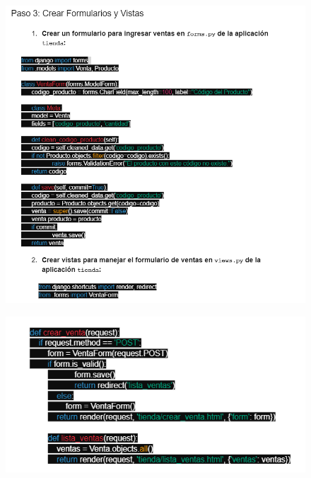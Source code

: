 \documentclass{article}
\begin{document}
	\begin{figure}[H]
		\centering
		\includegraphics[width=1.0\textwidth,keepaspectratio]{img/tercero.png}
	\end{figure}
	\begin{figure}[H]
		\centering
		\includegraphics[width=1.0\textwidth,keepaspectratio]{img/cuarto.png}
	\end{figure}
\end{document}

